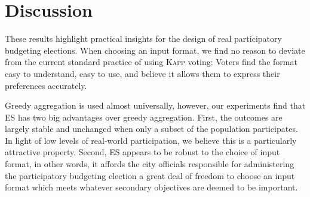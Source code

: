 \documentclass[mnsc,blindrev]{informs3_freeuse} %
\newcommand{\kibitz}[2]{\ifnum\Comments=1{\color{#1}{#2}}\fi}
\newcommand{\rf}[1]{\kibitz{blue}{[Roy says:#1]}}
\newcommand{\kapp}{\textsc{Kapp}}
\newcommand{\mes}{ES}
\begin{document}



\section{Discussion} 
 

These results highlight practical insights  for the design of real participatory budgeting elections. 
When choosing an input format, we find no reason to deviate from the current standard practice of  using \kapp{} voting: Voters find the format easy to understand, easy to  use, and believe it allows them to express their preferences accurately. 

Greedy aggregation is used almost universally,  however, our experiments find that \mes{} has  two  big advantages over greedy aggregation.  First,  the outcomes are largely stable and unchanged when only a subset of the population participates. In light of low levels of real-world participation, we believe this is a particularly attractive property. Second, \mes{} appears to be robust to the choice of input format, in other words, it affords the city officials responsible for administering the participatory budgeting election a great deal of freedom to choose an input format which meets whatever secondary objectives are deemed to be important. %
\end{document}
